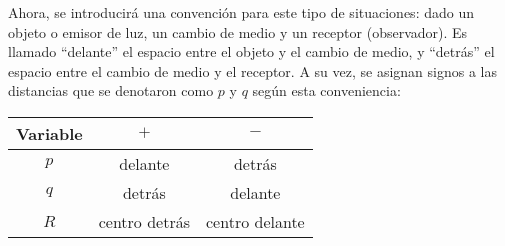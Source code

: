 \begin{longderivation}
        \\
    \To\\
        \\
    \\
        \\
    \To\\
        \\
    \\ 
        \\
    \equiv\\
\end{longderivation}

Ahora, se introducirá una convención para este tipo de situaciones:
dado un objeto o emisor de luz, un cambio de medio y un receptor
(observador). Es  llamado ``delante'' el espacio entre el objeto y el
cambio de medio, y ``detrás'' el espacio entre el cambio de medio y el
receptor. A su vez, se asignan signos a las distancias que se denotaron
como $p$ y $q$ según esta conveniencia:

\begin{center}
    \begin{tabular}{ | c | c | c | } 
        \hline
        Variable    & $+$            & $-$\\ 
        \hline
        $p$         & delante        & detrás \\ 
        \hline
        $q$         & detrás         & delante\\
        \hline
        $R$         & centro detrás  & centro delante\\ 
        \hline
      \end{tabular}
\end{center}
